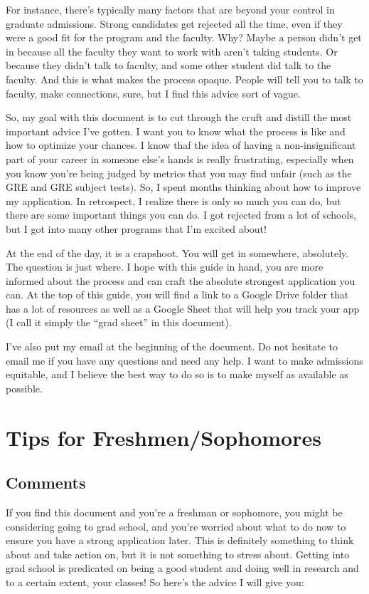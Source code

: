 \documentclass[12pt]{article}
\begin{document}
For instance, there's typically many factors that are beyond your control in graduate admissions. Strong candidates get rejected all the time, even if they were a good fit for the program and the faculty. Why? Maybe a person didn't get in because all the faculty they want to work with aren't taking students. Or because they didn't talk to faculty, and some other student did talk to the faculty. And this is what makes the process opaque. People will tell you to talk to faculty, make connections, sure, but I find this advice sort of vague.

So, my goal with this document is to cut through the cruft and distill the most important advice I've gotten. I want you to know what the process is like and how to optimize your chances. I know thaf the idea of having a non-insignificant part of your career in someone else's hands is really frustrating, especially when you know you're being judged by metrics that you may find unfair (such as the GRE and GRE subject tests). So, I spent months thinking about how to improve my application. In retrospect, I realize there is only so much you can do, but there are some important things you can do. I got rejected from a lot of schools, but I got into many other programs that I'm excited about! 

At the end of the day, it is a crapshoot. You will get in somewhere, absolutely. The question is just where. I hope with this guide in hand, you are more informed about the process and can craft the absolute strongest application you can. At the top of this guide, you will find a link to a Google Drive folder that has a lot of resources as well as a Google Sheet that will help you track your app (I call it simply the ``grad sheet'' in this document).

I've also put my email at the beginning of the document. Do not hesitate to email me if you have any questions and need any help. I want to make admissions equitable, and I believe the best way to do so is to make myself as available as possible.

\section{Tips for Freshmen/Sophomores}
\subsection{Comments}
If you find this document and you're a freshman or sophomore, you might be considering going to grad school, and you're worried about what to do now to ensure you have a strong application later. This is definitely something to think about and take action on, but it is not something to stress about. Getting into grad school is predicated on being a good student and doing well in research and to a certain extent, your classes! So here's the advice I will give you:
\end{document}
